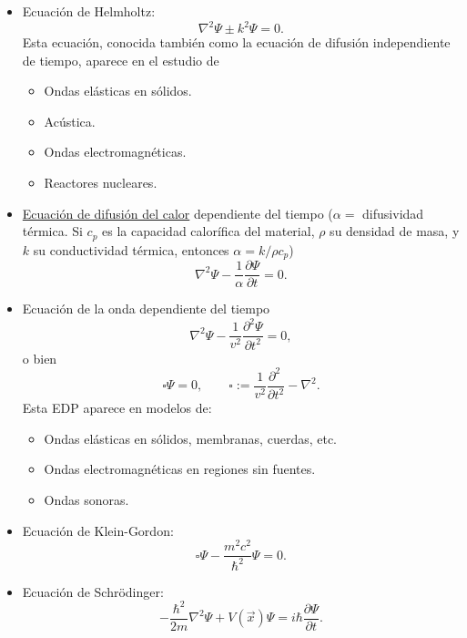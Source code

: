 \begin{itemize}
Por ejemplo, el potencial electrostático $\phi(\vec{x})$ satisface
\begin{equation}
\nabla^2\phi=-\frac{1}{\varepsilon_0}\rho(\vec{x}),
\end{equation}
donde $\varepsilon_0$ es la \textbf{permeabilidad del vacío} y $\rho(\vec{x})$ la \textbf{densidad (volumétrica) de carga eléctrica}.
\item Ecuación de Helmholtz: 
\begin{equation}
\nabla^2\Psi\pm k^2\Psi=0.
\end{equation}
Esta ecuación, conocida también como la ecuación de difusión independiente de tiempo, aparece en el estudio de
	\begin{itemize}
	\item Ondas elásticas en sólidos.
	\item Acústica.
	\item Ondas electromagnéticas.
	\item Reactores nucleares.
	\end{itemize}
\item \href{https://es.wikipedia.org/wiki/Ecuaci\%C3\%B3n_del_calor}{Ecuación de difusión del calor} dependiente del tiempo ($\alpha= $ difusividad térmica. Si $c_p$ es la capacidad calorífica del material, $\rho$ su densidad de masa, y $k$ su conductividad térmica, entonces $\alpha=k/\rho c_p$)
\begin{equation}\label{eccalor}
\nabla^2\Psi-\frac{1}{\alpha}\frac{\partial \Psi}{\partial t}=0 .
\end{equation}
\item Ecuación de la onda dependiente del tiempo
\begin{equation}
\nabla^2\Psi-\frac{1}{v^2}\frac{\partial^2\Psi}{\partial t^2} =0,
\end{equation}
o bien 
\begin{equation}
\square\Psi=0, \qquad \square:=\frac{1}{v^2}\frac{\partial^2\ }{\partial t^2}-\nabla^2.
\end{equation}
Esta EDP aparece en modelos de:
\begin{itemize}
\item Ondas elásticas en sólidos, membranas, cuerdas, etc.
\item Ondas electromagnéticas en regiones sin fuentes.
\item Ondas sonoras.
\end{itemize}

\item Ecuación de Klein-Gordon:
\begin{equation}
\square\Psi-\frac{m^2c^2}{\hbar^2}\Psi=0.
\end{equation}

\item Ecuación de Schr\"odinger:
\begin{equation}
-\frac{\hbar^2}{2m}\nabla^2\Psi+V(\vec{x})\Psi=i\hbar\frac{\partial\Psi}{\partial t}.
\end{equation}
\end{itemize}

